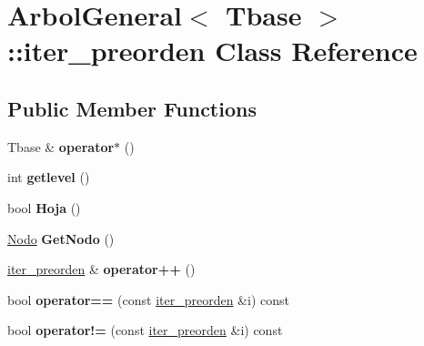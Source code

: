 \hypertarget{class_arbol_general_1_1iter__preorden}{}\section{Arbol\+General$<$ Tbase $>$\+:\+:iter\+\_\+preorden Class Reference}
\label{class_arbol_general_1_1iter__preorden}
\subsection*{Public Member Functions}
\begin{DoxyCompactItemize}
\item 
Tbase \& {\bfseries operator$\ast$} ()\hypertarget{class_arbol_general_1_1iter__preorden_a9361fd196b058b72741f23deb3be1baf}{}\label{class_arbol_general_1_1iter__preorden_a9361fd196b058b72741f23deb3be1baf}

\item 
int {\bfseries getlevel} ()\hypertarget{class_arbol_general_1_1iter__preorden_a0f126377b1deafcbcfb726ebba323d75}{}\label{class_arbol_general_1_1iter__preorden_a0f126377b1deafcbcfb726ebba323d75}

\item 
bool {\bfseries Hoja} ()\hypertarget{class_arbol_general_1_1iter__preorden_a5d3490dc035f686949e146ea3d27d72e}{}\label{class_arbol_general_1_1iter__preorden_a5d3490dc035f686949e146ea3d27d72e}

\item 
\hyperlink{class_arbol_general_a12cc1b74a9095d89bc7334290d332f7a}{Nodo} {\bfseries Get\+Nodo} ()\hypertarget{class_arbol_general_1_1iter__preorden_a25cca8d177bc3f68fe72b24e1da4e98b}{}\label{class_arbol_general_1_1iter__preorden_a25cca8d177bc3f68fe72b24e1da4e98b}

\item 
\hyperlink{class_arbol_general_1_1iter__preorden}{iter\+\_\+preorden} \& {\bfseries operator++} ()\hypertarget{class_arbol_general_1_1iter__preorden_aceecdfc105e29fd7f3d0969d6fef397e}{}\label{class_arbol_general_1_1iter__preorden_aceecdfc105e29fd7f3d0969d6fef397e}

\item 
bool {\bfseries operator==} (const \hyperlink{class_arbol_general_1_1iter__preorden}{iter\+\_\+preorden} \&i) const \hypertarget{class_arbol_general_1_1iter__preorden_a95b405ffd7732315ac1948a2531b101d}{}\label{class_arbol_general_1_1iter__preorden_a95b405ffd7732315ac1948a2531b101d}

\item 
bool {\bfseries operator!=} (const \hyperlink{class_arbol_general_1_1iter__preorden}{iter\+\_\+preorden} \&i) const \hypertarget{class_arbol_general_1_1iter__preorden_a9ee1bdf29431e64e22eb00b99ee63c0f}{}\label{class_arbol_general_1_1iter__preorden_a9ee1bdf29431e64e22eb00b99ee63c0f}

\end{DoxyCompactItemize}
